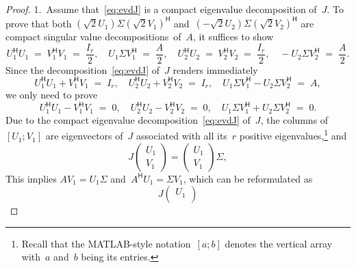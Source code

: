 \documentclass[11pt,a4paper]{article}
\theoremstyle{definition}
\newcommand{\hmt}{{\scriptscriptstyle{{\mathsf{H}}}}}
\begin{document}
\begin{proof} 1.~Assume that~\eqref{eq:evdJ} is a compact eigenvalue decomposition of~$J$. 
  To prove that both $(\sqrt{2} U_1)\Sigma (\sqrt{2} V_1)^\hmt$ and~$(-\sqrt{2}U_2)\Sigma
  (\sqrt{2}V_2)^\hmt$ are compact singular value decompositions~of~$A$, it suffices to show
  \begin{equation}
    \label{eq:svdA}
    U_1^\hmt U_1 
    \;=\; V_1^\hmt V_1 \;=\; \dfrac{I_r}{2},
    \quad U_1\Sigma V_1^\hmt \;=\; \dfrac{A}{2}, 
    \quad  U_2^\hmt U_2 \;=\; V_2^\hmt V_2 \;=\; \dfrac{I_r}{2},
    \quad -U_2\Sigma V_2^\hmt \;=\; \dfrac{A}{2}.
  \end{equation}
  Since the decomposition~\eqref{eq:evdJ} of~$J$ renders immediately 
  \begin{equation}
    \nonumber
    U_1^\hmt U_1 + V_1^\hmt V_1 \;=\; {I_r},
    \quad  U_2^\hmt U_2 + V_2^\hmt V_2 \;=\; {I_r},
    \quad U_1\Sigma V_1^\hmt - U_2\Sigma V_2^\hmt \;=\; A, 
  \end{equation}
  we only need to prove 
  \begin{equation}
    \label{eq:evdJdiff}
    U_1^\hmt U_1 - V_1^\hmt V_1 \;=\; 0, 
    \quad U_2^\hmt U_2 - V_2^\hmt V_2 \;=\; 0,
    \quad U_1\Sigma V_1^\hmt + U_2\Sigma V_2^\hmt \;=\; 0. 
  \end{equation}
  Due to the compact eigenvalue decomposition~\eqref{eq:evdJ} of~$J$, 
  the columns of~$[U_1; V_1]$ are eigenvectors of~$J$ associated with 
  all its~$r$ positive eigenvalues,\footnote{
   Recall that the MATLAB-style notation~$[a; b]$ denotes the vertical 
   array with~$a$ and~$b$ being its entries. 
  }
  and
  \begin{equation}
    \nonumber
    J 
    \begin{pmatrix}
      U_1 \\
      V_1
    \end{pmatrix}
    = 
    \begin{pmatrix}
      U_1 \\
      V_1
    \end{pmatrix}
    \Sigma,
  \end{equation}
   This implies $AV_1 = U_1\Sigma$ and~$A^\hmt U_1 = \Sigma V_1$, which can be reformulated as 
  \begin{equation}
    \nonumber
    J 
    \begin{pmatrix}
      U_1 \\

\end{pmatrix}
\end{equation}
\end{proof}
\end{document}
